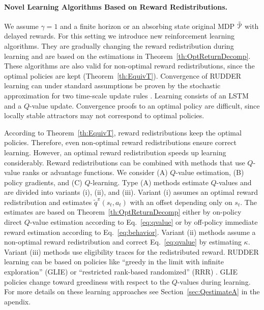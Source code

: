 \documentclass{article}
\begin{document}
\paragraph{Novel Learning Algorithms Based on Reward Redistributions.}
\label{c:novel}
We assume $\gamma=1$ and a finite horizon or an absorbing state
original MDP $\tilde{\mathcal{P}}$ with delayed rewards.
For this setting we introduce new reinforcement learning algorithms.
They are gradually changing 
the reward redistribution during learning and are
based on the estimations in Theorem~\ref{th:OptReturnDecomp}.
These algorithms are also valid for non-optimal reward redistributions,
since the optimal policies are kept (Theorem~\ref{th:EquivT}).
Convergence of RUDDER learning
can under standard assumptions be proven by the stochastic 
approximation for 
two time-scale update rules \cite{Borkar:97,Karmakar:17}.
Learning consists of an LSTM and a $Q$-value update.
Convergence proofs to an optimal policy are 
difficult, since locally stable attractors 
may not correspond to optimal policies.



According to Theorem~\ref{th:EquivT}, reward redistributions
keep the optimal policies. 
Therefore, even non-optimal reward redistributions ensure correct learning. 
However, an optimal reward redistribution speeds up learning considerably.
Reward redistributions can be combined 
with methods that use $Q$-value ranks or advantage functions.
We consider 
(A) $Q$-value estimation, 
(B) policy gradients, and 
(C) $Q$-learning.
Type (A) methods estimate $Q$-values and are divided 
into variants (i), (ii), and (iii).
Variant (i) assumes an optimal reward redistribution
and estimates $\tilde{q}^\pi(s_t,a_t)$ with an offset
depending only on $s_t$.
The estimates are based on Theorem~\ref{th:OptReturnDecomp}
either by on-policy direct $Q$-value estimation according to Eq.~\eqref{eq:qvalue}
or by off-policy immediate reward estimation according to Eq.~\eqref{eq:behavior}.
Variant (ii) methods assume a non-optimal reward redistribution and 
correct Eq.~\eqref{eq:qvalue} by estimating $\kappa$.
Variant (iii) methods use eligibility traces for the redistributed reward.
RUDDER learning can be based on policies like
``greedy in the limit with infinite exploration'' (GLIE) or
``restricted rank-based randomized'' (RRR) \cite{Singh:00}. 
GLIE policies change toward greediness with respect to the $Q$-values
during learning.
For more details on these learning approaches 
see Section~\ref{sec:QestimateA} in the apendix.
\end{document}
